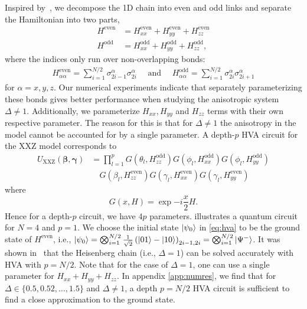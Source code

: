 \documentclass[
 aps,
 pra,
 showpacs,
 showkeys,
 superscriptaddress,
 reprint,%
twocolumn,
]{revtex4-1}
\begin{document}
        Inspired by~\cite{Ho2019}, we decompose the 1D chain into even and odd links and separate the Hamiltonian into two parts, 
        \begin{align*}
            H^{\text{even}} &= H^{\text{even}}_{xx} + H^{\text{even}}_{yy} + H^{\text{even}}_{zz} \\ 
            H^{\text{odd}}  &= H^{\text{odd}}_{xx} + H^{\text{odd}}_{yy} + H^{\text{odd}}_{zz} ,
        \end{align*}
        where the indices only run over non-overlapping bonds:
        \begin{align*}
            H^{\text{even}}_{\alpha\alpha} = \sum_{i=1}^{N/2} \sigma_{2i-1}^\alpha \sigma_{2i}^\alpha \quad \text{ and } \quad
            H^{\text{odd}}_{\alpha\alpha} = \sum_{i=1}^{N/2} \sigma_{2i}^\alpha \sigma_{2i+1}^\alpha
        \end{align*}
        for $\alpha =x,y,z$. Our numerical experiments indicate that separately parameterizing these bonds gives better performance when studying the anisotropic system $\Delta\neq1$. Additionally, we parameterize $H_{xx},H_{yy}$ and $H_{zz}$ terms with their own respective parameter. %
        The reason for this is that for $\Delta\neq 1$ the anisotropy in the model cannot be accounted for by a single parameter.
        A depth-$p$ HVA circuit for the XXZ model corresponds to 
        \begin{align}\label{eq:qaoa_xxz}
            U_{\text{XXZ}}(\bm{\beta},\bm{\gamma}) & = \prod_{l=1}^p  G(\theta_l, H_{zz}^{\text{odd}}) G(\phi_l, H_{xx}^{\text{odd}}) G(\phi_l, H_{yy}^{\text{odd}})\nonumber\\
            & \quad G(\beta_l, H_{zz}^{\text{even}}) G(\gamma_l,H_{xx}^{\text{even}}) G(\gamma_l, H_{yy}^{\text{even}})
        \end{align}
        where $$G(x, H) =\exp{-i \frac{x}{2} H}.$$
        Hence for a depth-$p$ circuit, we have $4p$ parameters.  illustrates a quantum circuit for $N=4$ and $p=1$. We choose the initial state $\ket{\psi_0}$ in \eqref{eq:hva} to be the ground state of $H^{\text{even}}$, i.e., $\ket{\psi_0} = \bigotimes^{N/2}_{i=1} \frac{1}{\sqrt{2}} \left(\ket{01} - \ket{10}\right)_{2i-1, 2i} =\bigotimes^{N/2}_{i=1}\ket{\Psi^-}$. It was shown in~\cite{Ho2019} that the Heisenberg chain (i.e., $\Delta = 1$) can be solved accurately with HVA with $p = N/2$. Note that for the case of $\Delta = 1$, one can use a single parameter for $H_{xx}+H_{yy}+H_{zz}$. In appendix \cref{app:numres}, we find that for $\Delta \in \{0.5, 0.52, \ldots, 1.5\}$ and $\Delta \neq 1$, a depth $p = N/2$ HVA circuit is sufficient to find a close approximation to the ground state.
\end{document}
